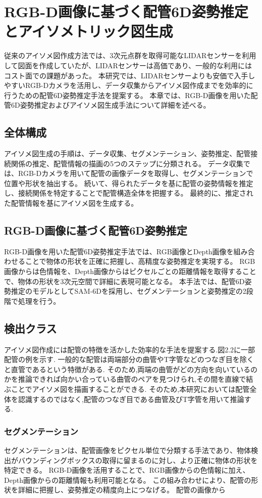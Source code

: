 \chapter{RGB-D画像に基づく配管6D姿勢推定とアイソメトリック図生成}
従来のアイソメ図作成方法では、3次元点群を取得可能なLIDARセンサーを利用して図面を作成していたが、LIDARセンサーは高価であり、一般的な利用にはコスト面での課題があった。
本研究では、LIDARセンサーよりも安価で入手しやすいRGB-Dカメラを活用し、データ収集からアイソメ図作成までを効率的に行うための配管6D姿勢推定手法を提案する。
本章では、RGB-D画像を用いた配管6D姿勢推定およびアイソメ図生成手法について詳細を述べる。

\section{全体構成}
アイソメ図生成の手順は、データ収集、セグメンテーション、姿勢推定、配管接続関係の推定、配管情報の描画の5つのステップに分類される。
データ収集では、RGB-Dカメラを用いて配管の画像データを取得し、セグメンテーションで位置や形状を抽出する。
続いて、得られたデータを基に配管の姿勢情報を推定し、接続関係を特定することで配管構造全体を把握する。
最終的に、推定された配管情報を基にアイソメ図を生成する。

\section{RGB-D画像に基づく配管6D姿勢推定}
RGB-D画像を用いた配管6D姿勢推定手法では、RGB画像とDepth画像を組み合わせることで物体の形状を正確に把握し、高精度な姿勢推定を実現する。
RGB画像からは色情報を、Depth画像からはピクセルごとの距離情報を取得することで、物体の形状を3次元空間で詳細に表現可能となる。
本手法では、配管6D姿勢推定のモデルとしてSAM-6Dを採用し、セグメンテーションと姿勢推定の2段階で処理を行う。

\section{検出クラス}
アイソメ図作成には配管の特徴を活かした効率的な手法を提案する.図2.2に一部配管の例を示す.
一般的な配管は両端部分の曲管やT字管などのつなぎ目を除くと直管であるという特徴がある.
そのため,両端の曲管がどの方向を向いているのかを推論できれば向かい合っている曲管のペアを見つけられ,その間を直線で結ぶことでアイソメ図を描画することができる.
そのため,本研究においては配管全体を認識するのではなく,配管のつなぎ目である曲管及びT字管を用いて推論する.

\subsection{セグメンテーション}
セグメンテーションは、配管画像をピクセル単位で分類する手法であり、物体検出がバウンディングボックスの取得に留まるのに対し、より正確に物体の形状を特定できる。
RGB-D画像を活用することで、RGB画像からの色情報に加え、Depth画像からの距離情報も利用可能となる。
この組み合わせにより、配管の形状を詳細に把握し、姿勢推定の精度向上につなげる。
配管の画像から

